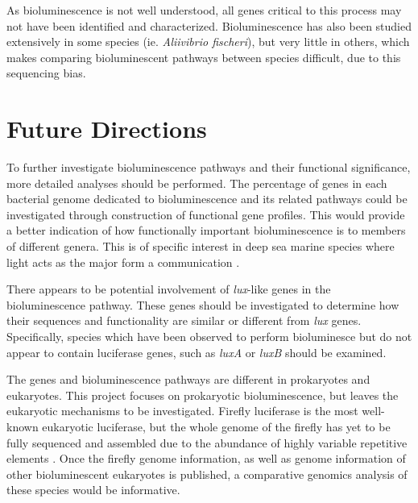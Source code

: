 \documentclass[fleqn,12pt]{wlscirep}
\begin{document}
As bioluminescence is not well understood, all genes critical to this process may not have been identified and characterized. Bioluminescence has also been studied extensively in some species (ie. \textit{Aliivibrio fischeri}), but very little in others, which makes comparing bioluminescent pathways between species difficult, due to this sequencing bias.

\section*{Future Directions}

To further investigate bioluminescence pathways and their functional significance, more detailed analyses should be performed. The percentage of genes in each bacterial genome dedicated to bioluminescence and its related pathways could be investigated through construction of functional gene profiles. This would provide a better indication of how functionally important bioluminescence is to members of different genera. This is of specific interest in deep sea marine species where light acts as the major form a communication \cite{d10}. 

There appears to be potential involvement of \textit{lux}-like genes in the bioluminescence pathway. These genes should be investigated to determine how their sequences and functionality are similar or different from \textit{lux} genes. Specifically, species which have been observed to perform bioluminesce but do not appear to contain luciferase genes, such as \textit{luxA} or \textit{luxB} should be examined.

The genes and bioluminescence pathways are different in prokaryotes and eukaryotes. This project focuses on prokaryotic bioluminescence, but leaves the eukaryotic mechanisms to be investigated. Firefly luciferase is the most well-known eukaryotic luciferase, but the whole genome of the firefly has yet to be fully sequenced and assembled due to the abundance of highly variable repetitive elements \cite{t5}. Once the firefly genome information, as well as genome information of other bioluminescent eukaryotes is published, a comparative genomics analysis of these species would be informative. 

\newpage


\end{document}
